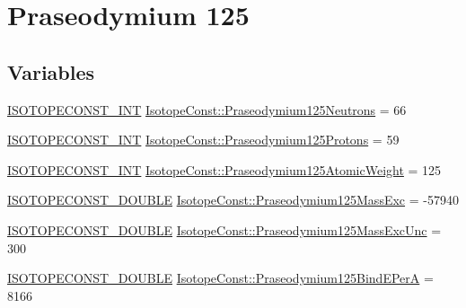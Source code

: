 \hypertarget{group___isotope_const-_praseodymium-_pr125}{}\section{Praseodymium 125}
\label{group___isotope_const-_praseodymium-_pr125}
\subsection*{Variables}
\begin{DoxyCompactItemize}
\item 
\mbox{\hyperlink{group___isotope_const-_macros_ga5f18360b3e99483a35c32d789e62621c}{I\+S\+O\+T\+O\+P\+E\+C\+O\+N\+S\+T\+\_\+\+I\+NT}} \mbox{\hyperlink{group___isotope_const-_praseodymium-_pr125_gaf7c0bb10c6a39af294512f03e3368067}{Isotope\+Const\+::\+Praseodymium125\+Neutrons}} = 66
\item 
\mbox{\hyperlink{group___isotope_const-_macros_ga5f18360b3e99483a35c32d789e62621c}{I\+S\+O\+T\+O\+P\+E\+C\+O\+N\+S\+T\+\_\+\+I\+NT}} \mbox{\hyperlink{group___isotope_const-_praseodymium-_pr125_ga6f22e9d3b2449fa68153eb0511897c0b}{Isotope\+Const\+::\+Praseodymium125\+Protons}} = 59
\item 
\mbox{\hyperlink{group___isotope_const-_macros_ga5f18360b3e99483a35c32d789e62621c}{I\+S\+O\+T\+O\+P\+E\+C\+O\+N\+S\+T\+\_\+\+I\+NT}} \mbox{\hyperlink{group___isotope_const-_praseodymium-_pr125_ga48c7c156c8aaf66d99710d3a0c89776e}{Isotope\+Const\+::\+Praseodymium125\+Atomic\+Weight}} = 125
\item 
\mbox{\hyperlink{group___isotope_const-_macros_ga8f45a7272ce02c0b4c65c44636ed719a}{I\+S\+O\+T\+O\+P\+E\+C\+O\+N\+S\+T\+\_\+\+D\+O\+U\+B\+LE}} \mbox{\hyperlink{group___isotope_const-_praseodymium-_pr125_gabd04886209daf2067dccda7708b0ff0b}{Isotope\+Const\+::\+Praseodymium125\+Mass\+Exc}} = -\/57940
\item 
\mbox{\hyperlink{group___isotope_const-_macros_ga8f45a7272ce02c0b4c65c44636ed719a}{I\+S\+O\+T\+O\+P\+E\+C\+O\+N\+S\+T\+\_\+\+D\+O\+U\+B\+LE}} \mbox{\hyperlink{group___isotope_const-_praseodymium-_pr125_ga40f1b04b73bc95389f3ca80829871aa0}{Isotope\+Const\+::\+Praseodymium125\+Mass\+Exc\+Unc}} = 300
\item 
\mbox{\hyperlink{group___isotope_const-_macros_ga8f45a7272ce02c0b4c65c44636ed719a}{I\+S\+O\+T\+O\+P\+E\+C\+O\+N\+S\+T\+\_\+\+D\+O\+U\+B\+LE}} \mbox{\hyperlink{group___isotope_const-_praseodymium-_pr125_ga257e5fbbf936607d70490360645228a5}{Isotope\+Const\+::\+Praseodymium125\+Bind\+E\+PerA}} = 8166

\end{DoxyCompactItemize}
